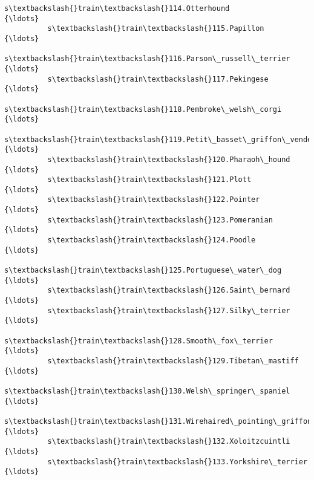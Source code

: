 \documentclass[11pt]{article}
\begin{document}
\begin{Verbatim}[commandchars=\\\{\}]
          s\textbackslash{}train\textbackslash{}114.Otterhound                                      {\ldots}                 
          s\textbackslash{}train\textbackslash{}115.Papillon                                        {\ldots}                 
          s\textbackslash{}train\textbackslash{}116.Parson\_russell\_terrier                          {\ldots}                 
          s\textbackslash{}train\textbackslash{}117.Pekingese                                       {\ldots}                 
          s\textbackslash{}train\textbackslash{}118.Pembroke\_welsh\_corgi                            {\ldots}                 
          s\textbackslash{}train\textbackslash{}119.Petit\_basset\_griffon\_vendeen                    {\ldots}                 
          s\textbackslash{}train\textbackslash{}120.Pharaoh\_hound                                   {\ldots}                 
          s\textbackslash{}train\textbackslash{}121.Plott                                           {\ldots}                 
          s\textbackslash{}train\textbackslash{}122.Pointer                                         {\ldots}                 
          s\textbackslash{}train\textbackslash{}123.Pomeranian                                      {\ldots}                 
          s\textbackslash{}train\textbackslash{}124.Poodle                                          {\ldots}                 
          s\textbackslash{}train\textbackslash{}125.Portuguese\_water\_dog                            {\ldots}                 
          s\textbackslash{}train\textbackslash{}126.Saint\_bernard                                   {\ldots}                 
          s\textbackslash{}train\textbackslash{}127.Silky\_terrier                                   {\ldots}                 
          s\textbackslash{}train\textbackslash{}128.Smooth\_fox\_terrier                              {\ldots}                 
          s\textbackslash{}train\textbackslash{}129.Tibetan\_mastiff                                 {\ldots}                 
          s\textbackslash{}train\textbackslash{}130.Welsh\_springer\_spaniel                          {\ldots}                 
          s\textbackslash{}train\textbackslash{}131.Wirehaired\_pointing\_griffon                     {\ldots}                 
          s\textbackslash{}train\textbackslash{}132.Xoloitzcuintli                                  {\ldots}                 
          s\textbackslash{}train\textbackslash{}133.Yorkshire\_terrier                               {\ldots}                 
          

\end{Verbatim}
\end{document}
